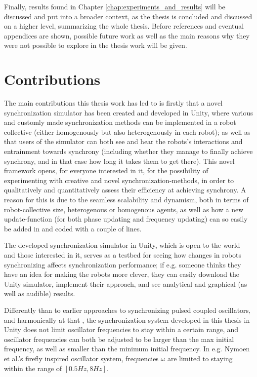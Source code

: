 Finally, results found in Chapter \ref{chap:experiments_and_results} will be discussed and put into a broader context, as the thesis is concluded and discussed on a higher level, summarizing the whole thesis. Before references and eventual appendices are shown, possible future work as well as the main reasons why they were not possible to explore in the thesis work will be given.




\section{Contributions}

The main contributions this thesis work has led to is firstly that a novel synchronization simulator has been created and developed in Unity, where various and customly made synchronization methods can be implemented in a robot collective (either homogenously but also heterogenously in each robot); as well as that users of the simulator can both see and hear the robots's interactions and entrainment towards synchrony (including whether they manage to finally achieve synchrony, and in that case how long it takes them to get there). This novel framework opens, for everyone interested in it, for the possibility of experimenting with creative and novel synchronization-methods, in order to qualitatively and quantitatively assess their efficiency at achieving synchrony. A reason for this is due to the seamless scalability and dynamism, both in terms of robot-collective size, heterogenous or homogenous agents, as well as how a new update-function (for both phase updating and frequency updating) can so easily be added in and coded with a couple of lines.

The developed synchronization simulator in Unity, which is open to the world and those interested in it, serves as a testbed for seeing how changes in robots synchronizing affects synchronization performance; if e.g. someone thinks they have an idea for making the robots more clever, they can easily download the Unity simulator, implement their approach, and see analytical and graphical (as well as audible) results.

Differently than to earlier approaches to synchronizing pulsed coupled oscillators, and harmonically at that \cite{nymoen_synch}, the synchronization system developed in this thesis in Unity does not limit oscillator frequencies to stay within a certain range, and oscillator frequencies can both be adjusted to be larger than the max initial frequency, as well as smaller than the minimum initial frequency. In e.g. Nymoen et al.'s firefly inspired oscillator system, frequencies $\omega$ are limited to staying within the range of $[0.5Hz, 8Hz]$.

